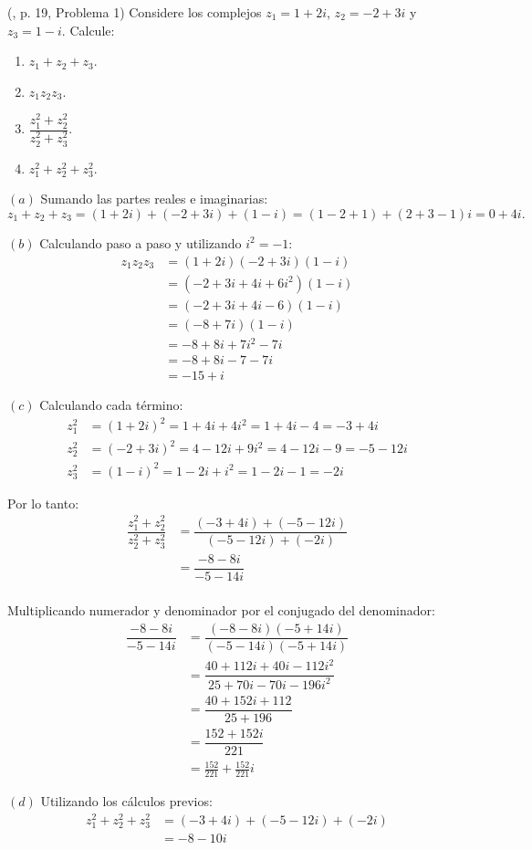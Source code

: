 \begin{prob}  (\cite{andreescu2014complex}, p. 19, Problema 1) Considere los complejos $z_1=1+2i$, $z_2=-2+3i$ y $z_3=1-i$. Calcule:
\begin{multicols}{2}
\begin{enumerate}[$(a)$]
\item $z_1+z_2+z_3$.
\item $z_1z_2z_3$.
\item $\dfrac{z_1^2 + z_2^2}{z_2^2+z_3^2}$.
\item $z_1^2 + z_2^2 +z_3^2$.
\end{enumerate}
\end{multicols}
\begin{myproof}	
$(a)$ Sumando las partes reales e imaginarias:
\begin{equation}
z_1+z_2+z_3 = (1+2i)+(-2+3i)+(1-i)=(1-2+1)+(2+3-1)i= \boxed{0+4i}.
\end{equation}

$(b)$ Calculando paso a paso y utilizando $i^2=-1$:
\begin{align*}
z_1z_2z_3 &= (1+2i)(-2+3i)(1-i)\\
&= (-2+3i+4i+6i^2)(1-i)\\
&= (-2+3i+4i-6)(1-i)\\
&= (-8+7i)(1-i)\\
&= -8+8i+7i^2-7i\\
&= -8+8i-7-7i\\
&= \boxed{-15+i}
\end{align*}

$(c)$ Calculando cada término:
\begin{align*}
z_1^2 &= (1+2i)^2 = 1+4i+4i^2 = 1+4i-4 = -3+4i\\
z_2^2 &= (-2+3i)^2 = 4-12i+9i^2 = 4-12i-9 = -5-12i\\
z_3^2 &= (1-i)^2 = 1-2i+i^2 = 1-2i-1 = -2i
\end{align*}

Por lo tanto:
\begin{align*}
\dfrac{z_1^2 + z_2^2}{z_2^2+z_3^2} &= \dfrac{(-3+4i) + (-5-12i)}{(-5-12i)+(-2i)}\\
&= \dfrac{-8-8i}{-5-14i}\\
\end{align*}

Multiplicando numerador y denominador por el conjugado del denominador:
\begin{align*}
\dfrac{-8-8i}{-5-14i} &= \dfrac{(-8-8i)(-5+14i)}{(-5-14i)(-5+14i)}\\
&= \dfrac{40+112i+40i-112i^2}{25+70i-70i-196i^2}\\
&= \dfrac{40+152i+112}{25+196}\\
&= \dfrac{152+152i}{221}\\
&= \boxed{\frac{152}{221}+\frac{152}{221}i}
\end{align*}

$(d)$ Utilizando los cálculos previos:
\begin{align*}
z_1^2 + z_2^2 +z_3^2 &= (-3+4i) + (-5-12i) + (-2i)\\
&= -8-10i
\end{align*}
\end{myproof}
\end{prob}

